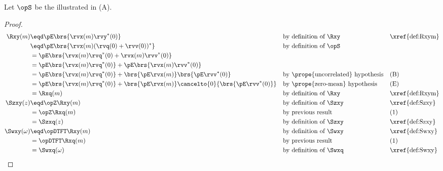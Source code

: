 \begin{theorem}
\label{thm:sysT_addnoise_v}
Let $\opS$ be the  illustrated in  (A).
\end{theorem}
\begin{proof}
\begin{align*}
  \Rxy(m)
    &\eqd \pE\brs{\rvx(m)\rvy^\ast(0)}
    && \text{by definition of $\Rxy$}
    && \text{\xref{def:Rxym}}
  \\&\eqd \pE\brs{\rvx(m)(\rvq(0)+\rvv(0))^\ast}
    && \text{by definition of $\opS$}
  \\&= \pE\brs{\rvx(m)\rvq^\ast(0)+\rvx(m)\rvv^\ast(0)}
  \\&= \pE\brs{\rvx(m)\rvq^\ast(0)} + \pE\brs{\rvx(m)\rvv^\ast(0)}
  \\&= \pE\brs{\rvx(m)\rvq^\ast(0)} + \brs{\pE\rvx(m)}\brs{\pE\rvv^\ast(0)}
    && \text{by \prope{uncorrelated} hypothesis}
    && \text{(B)}
  \\&= \pE\brs{\rvx(m)\rvq^\ast(0)} + \brs{\pE\rvx(m)}\cancelto{0}{\brs{\pE\rvv^\ast(0)}}
    && \text{by \prope{zero-mean} hypothesis}
    && \text{(E)}
  \\&= \Rxq(m)
    && \text{by definition of $\Rxy$}
    && \text{\xref{def:Rxym}}
  \\
  \Szxy(z)
    &\eqd \opZ\Rxy(m)
    && \text{by definition of $\Szxy$}
    && \text{\xref{def:Szxy}}
  \\&= \opZ\Rxq(m)
    && \text{by previous result}
    && \text{(1)}
  \\&= \Szxq(z)
    && \text{by definition of $\Szxy$}
    && \text{\xref{def:Szxy}}
  \\
  \Swxy(\omega)
    &\eqd \opDTFT\Rxy(m)
    && \text{by definition of $\Swxy$}
    && \text{\xref{def:Swxy}}
  \\&= \opDTFT\Rxq(m)
    && \text{by previous result}
    && \text{(1)}
  \\&= \Swxq(\omega)
    && \text{by definition of $\Swxq$}
    && \text{\xref{def:Swxy}}
\end{align*}
\end{proof}

